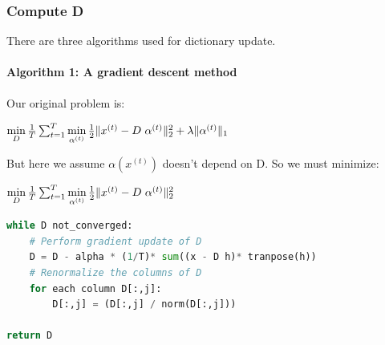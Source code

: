 \documentclass[a4paper,10pt]{article}
\begin{document}
\subsubsection{Compute D}
There are three algorithms used for  dictionary update.
\paragraph{Algorithm 1: A gradient descent method}
Our original problem is:
\begin{center}
 $\min\limits_{D} \frac{1}{T} \sum_{t=1}^{T}  \min\limits_{\alpha^{(t)}} \frac{1}{2} \| x^{(t)} - D \hspace{3px} \alpha^{(t)} \|_2^2 + \lambda \|\alpha^{(t)} \|_1$\\
\end{center}
But here we assume $\alpha(x^{(t)})$ doesn't depend on D. So we must minimize:
\begin{center}
 $\min\limits_{D} \frac{1}{T} \sum_{t=1}^{T}  \min\limits_{\alpha^{(t)}} \frac{1}{2} \| x^{(t)} - D \hspace{3px} \alpha^{(t)} \|_2^2 $\\
\end{center}
\begin{lstlisting}[language=Python,frame=single]
while D not_converged:
    # Perform gradient update of D
    D = D - alpha * (1/T)* sum((x - D h)* tranpose(h))
    # Renormalize the columns of D
    for each column D[:,j]:
        D[:,j] = (D[:,j] / norm(D[:,j]))

return D
\end{lstlisting}
\end{document}

